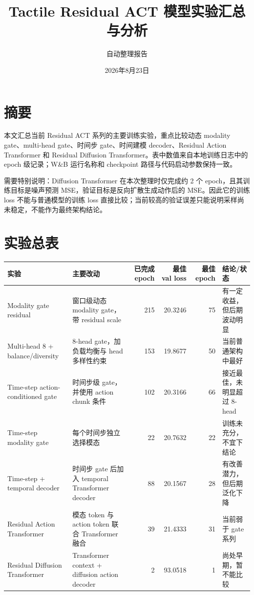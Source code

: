\documentclass[UTF8,a4paper]{ctexart}
\title{Tactile Residual ACT 模型实验汇总与分析}
\author{自动整理报告}
\date{2026年8月23日}
\begin{document}
\maketitle

\section{摘要}
本文汇总当前 Residual ACT 系列的主要训练实验，重点比较动态 modality gate、multi-head gate、时间步 gate、时间建模 decoder、Residual Action Transformer 和 Residual Diffusion Transformer。表中数值来自本地训练日志中的 epoch 级记录；W\&B 运行名称和 checkpoint 路径与代码启动参数保持一致。

需要特别说明：Diffusion Transformer 在本次整理时仅完成约 2 个 epoch，且其训练目标是噪声预测 MSE，验证目标是反向扩散生成动作后的 MSE。因此它的训练 loss 不能与普通模型的训练 loss 直接比较；当前较高的验证误差只能说明采样尚未稳定，不能作为最终架构结论。

\section{实验总表}
\begin{longtable}{p{3.2cm}p{4.2cm}r r r p{3.4cm}}
\toprule
实验 & 主要改动 & 已完成 epoch & 最佳 val loss & 最佳 epoch & 结论/状态\\
\midrule
\endhead
Modality gate residual & 窗口级动态 modality gate，带 residual scale & 215 & 20.3246 & 75 & 有一定收益，但后期波动明显\\
Multi-head 8 + balance/diversity & 8-head gate，加负载均衡与 head 多样性约束 & 153 & 19.8677 & 50 & 当前普通架构中最好\\
Time-step action-conditioned gate & 时间步级 gate，并使用 action chunk 条件 & 102 & 20.3166 & 66 & 接近最佳，未明显超过 8-head\\
Time-step modality gate & 每个时间步独立选择模态 & 22 & 20.7632 & 22 & 训练未充分，不宜下结论\\
Time-step + temporal decoder & 时间步 gate 后加入 temporal Transformer decoder & 88 & 20.1567 & 28 & 有改善潜力，但后期泛化下降\\
Residual Action Transformer & 模态 token 与 action token 联合 Transformer 融合 & 39 & 21.4333 & 31 & 当前弱于 gate 系列\\
Residual Diffusion Transformer & Transformer context + diffusion action decoder & 2 & 93.0518 & 1 & 尚处早期，暂不能比较\\
\bottomrule
\end{longtable}
\end{document}

